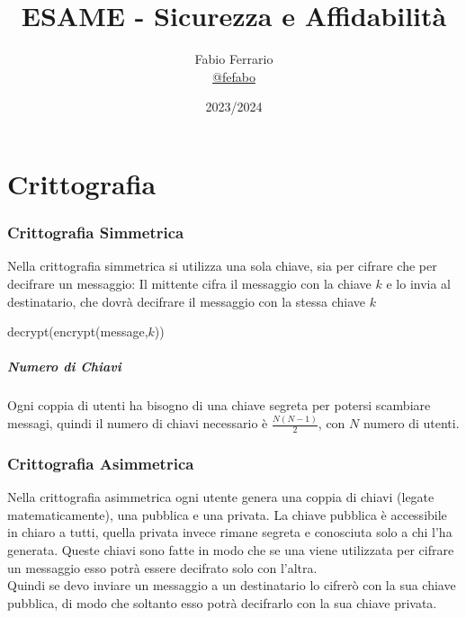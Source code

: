 \documentclass[12pt, a4paper, openany]{book}
\begin{document}
\title{ESAME - Sicurezza e Affidabilità}

\author{
	Fabio Ferrario\\
	\small{\href{https://t.me/fefabo}{@fefabo}}
}

\date{2023/2024}

\maketitle

\tableofcontents

\chapter{Crittografia}

\subsection{Crittografia Simmetrica}
    Nella crittografia simmetrica si utilizza una sola chiave, sia per cifrare che per decifrare un messaggio:
    Il mittente cifra il messaggio con la chiave $k$ e lo invia al destinatario, che dovrà decifrare il messaggio con la stessa chiave $k$
    \begin{center}
        decrypt(encrypt(message,$k$))
    \end{center}
    \paragraph{Numero di Chiavi} Ogni coppia di utenti ha bisogno di una chiave segreta per potersi scambiare messagi,
    quindi il numero di chiavi necessario è $\frac{N(N-1)}{2}$, con $N$ numero di utenti.

\subsection{Crittografia Asimmetrica}    
    Nella crittografia asimmetrica ogni utente genera una coppia di chiavi (legate matematicamente), una pubblica e una privata.
    La chiave pubblica è accessibile in chiaro a tutti, quella privata invece rimane segreta e conosciuta solo a chi l'ha generata. 
    Queste chiavi sono fatte in modo che se una viene utilizzata per cifrare un messaggio esso potrà essere decifrato solo con l'altra.
    \\Quindi se devo inviare un messaggio a un destinatario lo cifrerò con la sua chiave pubblica, di modo che soltanto esso potrà decifrarlo con la sua chiave privata.
    
\end{document}
